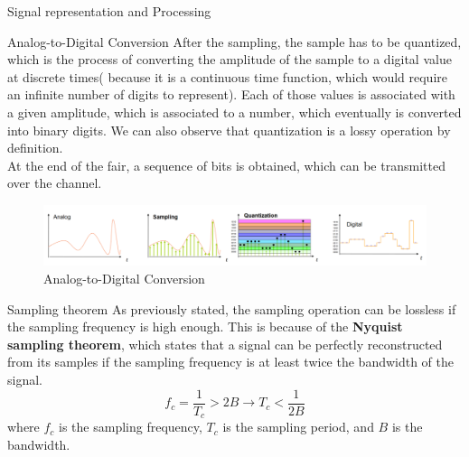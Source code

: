 \begin{section}{Signal representation and Processing}
\begin{subsection}{Analog-to-Digital Conversion}
      After the sampling, the sample has to be quantized, which is the process of converting the
      amplitude of the sample to a digital value at discrete times( because it is a continuous
      time function, which would require an infinite number of digits to represent). Each of those 
      values is associated with a given amplitude, which is associated to a number, which 
      eventually is converted into binary digits. We can also observe that quantization is a lossy
      operation by definition.\\
      At the end of the fair, a sequence of bits is obtained, which can be transmitted over the
      channel.\\
      \begin{figure}[h]
        \centering
        \includegraphics[width=\textwidth]{img/wireless/analog to digital.png}
        \caption{Analog-to-Digital Conversion}
        \label{fig:ADC}
      \end{figure}
      \begin{subsubsection}{Sampling theorem}
        As previously stated, the sampling operation can be lossless if the sampling frequency is
        high enough. This is because of the \textbf{Nyquist sampling theorem}, which states
        that a signal can be perfectly reconstructed from its samples if the sampling frequency is
        at least twice the bandwidth of the signal.\\
        \begin{equation}
          f_c=\frac{1}{T_c}>2B\to T_c<\frac{1}{2B}
        \end{equation}
        where $f_c$ is the sampling frequency, $T_c$ is the sampling period, and $B$ is the bandwidth.
        \end{subsubsection}
    \end{subsection}
\end{section}

